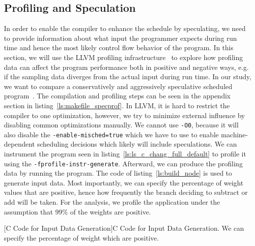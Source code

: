 \subsection{Profiling and Speculation}
In order to enable the compiler to enhance the schedule by speculating, we need to provide information about what input the programmer expects during run time and hence the most likely control flow behavior of the program. In this section, we will use the LLVM profiling infrastructure~\cite{llvm_profdata} to explore how profiling data can affect the program performance both in positive and negative ways, e.g. if the sampling data diverges from the actual input during run time. In our study, we want to compare a conservatively and aggressively speculative scheduled program~\cite{estes2014schedmachinemodel}. The compilation and profiling steps can be seen in the appendix section in listing~\ref{ls:makefile_specprof}. In LLVM, it is hard to restrict the compiler to one optimization, however, we try to minimize external influence by disabling common optimizations manually. We cannot use \texttt{-O0}, because it will also disable the \texttt{-enable-misched=true} which we have to use to enable machine-dependent scheduling decisions which likely will include speculations. We can instrument the program seen in listing~\ref{ls:ls_c_chang_full_default} to profile it using the \texttt{-fprofile-instr-generate}. Afterward, we can produce the profiling data by running the program. The code of listing~\ref{ls:build_node} is used to generate input data. Most importantly, we can specify the percentage of weight values that are positive, hence how frequently the branch deciding to subtract or add will be taken. For the analysis, we profile the application under the assumption that 99\% of the weights are positive.
\newpage 

\begin{center}
        
        \captionsetup{type=listing}
        [C Code for Input Data Generation]{C Code for Input Data Generation. We can specify the percentage of weight which are positive.}
        \label{ls:build_node}
\end{center}

